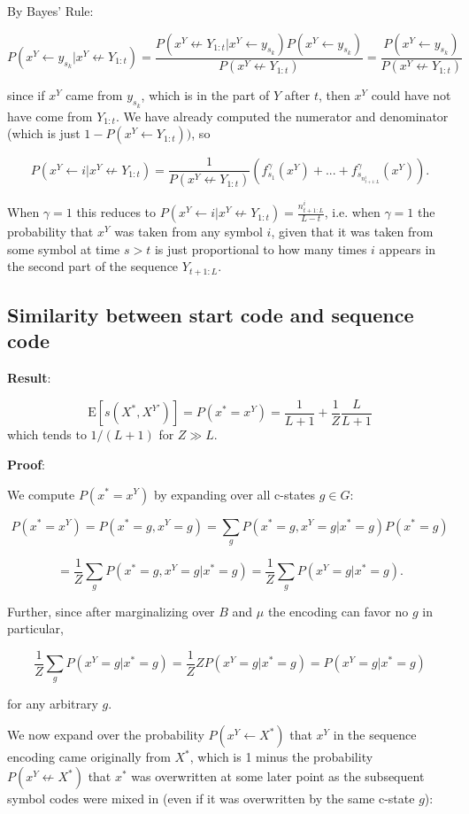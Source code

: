 \documentclass{article}
\begin{document}
By Bayes' Rule:

$$P(x^Y \leftarrow y_{s_k}| x^Y \not \leftarrow Y_{1:t}) = \frac{P(x^Y \not \leftarrow Y_{1:t}| x^Y \leftarrow y_{s_k})P(x^Y \leftarrow y_{s_k})}{P(x^Y \not\leftarrow Y_{1:t})} = \frac{P(x^Y \leftarrow y_{s_k})}{P(x^Y \not\leftarrow Y_{1:t})}$$

since if $x^Y$ came from $y_{s_k}$, which is in the part of $Y$ after $t$, then $x^Y$ could have not have come from $Y_{1:t}$. We have already computed the numerator and denominator (which is just $1 - P(x^Y \leftarrow Y_{1:t}))$, so

$$P(x^Y \leftarrow i|x^Y \not \leftarrow Y_{1:t}) = \frac{1}{P(x^Y \not\leftarrow Y_{1:t})}\left( f^\gamma_{s_1}(x^Y) + ... + f^\gamma_{s_{n^i_{t+1:L}}}(x^Y) \right).$$

When $\gamma = 1$ this reduces to $P(x^Y \leftarrow i|x^Y \not \leftarrow Y_{1:t}) = \frac{n^i_{t+1:L}}{L-t}$, i.e. when $\gamma = 1$ the probability that $x^Y$ was taken from any symbol $i$, given that it was taken from some symbol at time $s > t$ is just proportional to how many times $i$ appears in the second part of the sequence $Y_{t+1:L}$.

\subsection{Similarity between start code and sequence code}
\label{sec:sml-start-seq}

\textbf{Result}:

$$\textrm{E}[s(X^*, X^{Y'})] = P(x^* = x^Y) = \frac{1}{L+1} + \frac{1}{Z}\frac{L}{L+1}$$
which tends to $1/(L+1)$ for $Z \gg L$.

\textbf{Proof}:

We compute $P(x^* = x^Y)$ by expanding over all c-states $g \in G$:

$$P(x^* = x^Y) = P(x^* = g, x^Y = g) = \sum\limits_g P(x^* = g, x^Y = g|x^* = g)P(x^* = g)$$

$$ = \frac{1}{Z}\sum\limits_g P(x^* = g, x^Y = g|x^* = g) = \frac{1}{Z}\sum\limits_g P(x^Y = g|x^* = g).$$

Further, since after marginalizing over $B$ and $\mu$ the encoding can favor no $g$ in particular,

$$\frac{1}{Z}\sum\limits_g P(x^Y = g|x^* = g) = \frac{1}{Z}ZP(x^Y = g|x^* = g) = P(x^Y = g|x^* = g)$$

for any arbitrary $g$.

We now expand over the probability $P(x^Y \leftarrow X^*)$ that $x^Y$ in the sequence encoding came originally from $X^*$, which is 1 minus the probability $P(x^Y \not \leftarrow X^*)$ that $x^*$ was overwritten at some later point as the subsequent symbol codes were mixed in (even if it was overwritten by the same c-state $g$):
\end{document}
